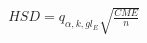 \documentclass[preview]{standalone}
\begin{document}
\begin{align*}
HSD = q_{\alpha, k, gl_E} \sqrt{\frac{CME}{n}}
\end{align*}
\end{document}
